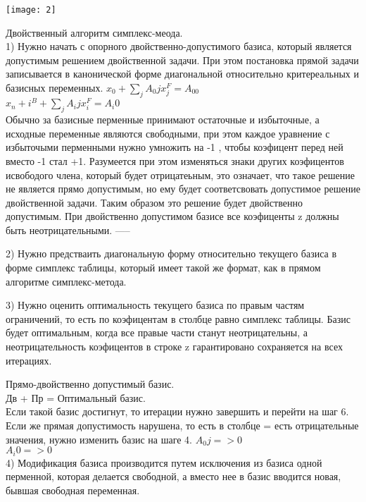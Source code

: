 \texttt{[image: 2]}



\Large {Двойственный алгоритм симплекс-меода.}\\

1) Нужно начать с опорного двойственно-допустимого базиса, который является допустимым решением двойственной задачи.
При этом постановка прямой задачи записывается  в канонической форме диагональной относительно критереальных и базисных переменных.
$ x_0 + \sum \limits_j A_0j x_j^F = A_00 $\\
$x_n+i ^B +  \sum \limits_j A_ij x_i^F = A_i0 $\\

Обычно за базисные перменные принимают остаточные и избыточные, а исходные переменные являются свободными,
при этом каждое уравнение с избыточыми перменными нужно умножить на -1 , чтобы коэфицент перед ней вместо -1 стал +1.
Разумеется при этом изменяться знаки других коэфицентов исвободого члена, который будет отрицатеьным, это означает, что такое решение не является прямо допустимым, но ему будет соответсвовать допустимое решение двойственной задачи.
Таким образом это решение будет двойственно допустимым.
При двойственно допустимом базисе  все коэфиценты z должны быть неотрицательными. -----

2) Нужно  предстваить диагональную форму относительно текущего базиса в форме симплекс таблицы,
который имеет такой же формат, как в прямом алгоритме симплекс-метода.


3) Нужно оценить оптимальность текущего базиса по правым частям ограничений,
то есть по коэфицентам в столбце равно симплекс таблицы. Базис будет оптимальным,
когда все правые части станут неотрицательны, а неотрицательность коэфицентов в строке z гарантировано сохраняется на всех итерациях.


Прямо-двойственно допустимый базис.\\
Дв + Пр = Оптимальный базис.\\
Если такой базис достигнут, то итерации нужно завершить и перейти на шаг 6.
Если же прямая допустимость нарушена, то есть в столбце = есть отрицательные значения, нужно изменить базис на шаге 4.
$ A_0j => 0 $\\
$ A_i0 => 0 $\\

4) Модификация базиса производится путем исключения из базиса одной перменной, которая делается свободной,
а вместо нее в базис вводится новая, бывшая свободная переменная.
